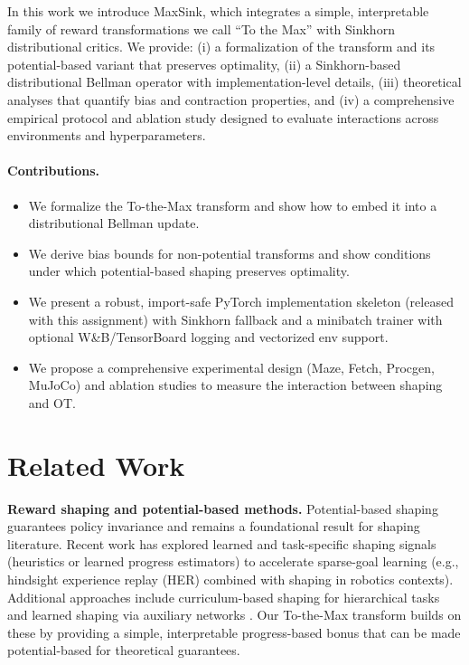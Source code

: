 \documentclass{article}
\begin{document}
In this work we introduce MaxSink, which integrates a simple, interpretable family of reward transformations we call ``To the Max'' with Sinkhorn distributional critics. We provide: (i) a formalization of the transform and its potential-based variant that preserves optimality, (ii) a Sinkhorn-based distributional Bellman operator with implementation-level details, (iii) theoretical analyses that quantify bias and contraction properties, and (iv) a comprehensive empirical protocol and ablation study designed to evaluate interactions across environments and hyperparameters.

\paragraph{Contributions.}
\begin{itemize}
  \item We formalize the To-the-Max transform and show how to embed it into a distributional Bellman update.
  \item We derive bias bounds for non-potential transforms and show conditions under which potential-based shaping preserves optimality.
  \item We present a robust, import-safe PyTorch implementation skeleton (released with this assignment) with Sinkhorn fallback and a minibatch trainer with optional W\&B/TensorBoard logging and vectorized env support.
  \item We propose a comprehensive experimental design (Maze, Fetch, Procgen, MuJoCo) and ablation studies to measure the interaction between shaping and OT.
\end{itemize}

\section{Related Work}
\textbf{Reward shaping and potential-based methods.} Potential-based shaping \cite{ng1999policy} guarantees policy invariance and remains a foundational result for shaping literature. Recent work has explored learned and task-specific shaping signals (heuristics or learned progress estimators) to accelerate sparse-goal learning (e.g., hindsight experience replay (HER) \cite{andrychowicz2017hindsight} combined with shaping in robotics contexts). Additional approaches include curriculum-based shaping for hierarchical tasks \cite{florensa2017reverse} and learned shaping via auxiliary networks \cite{harutyunyan2019hindsight}. Our To-the-Max transform builds on these by providing a simple, interpretable progress-based bonus that can be made potential-based for theoretical guarantees.
\end{document}
